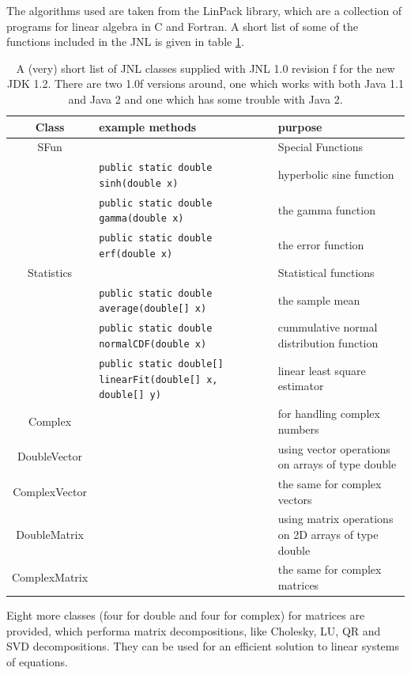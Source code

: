 The algorithms used are taken from the LinPack library, which
are a collection of programs for linear algebra in C and Fortran.
A short list of some of the functions included in the JNL is
given in table \ref{tab:JNL}.
\begin{table}
    \begin{tabular}{>{\large}c||>{\scriptsize}l|l}
      \textbf{Class}  & \normalsize\textbf{example methods} & \textbf{purpose} \\\hline\hline
      SFun &  & Special Functions \\
           & \verb|public static double sinh(double x)| & hyperbolic sine function \\
           & \verb|public static double gamma(double x)| & the gamma function \\
           & \verb|public static double erf(double x)| & the error function \\\hline
      Statistics &  & Statistical functions \\
           & \verb|public static double average(double[] x)| & the sample mean\\
           & \verb|public static double normalCDF(double x)| & 
                             cummulative normal distribution function\\
           & \verb|public static double[] linearFit(double[] x, double[] y)| &
                             linear least square estimator \\\hline
      Complex &  & for handling complex numbers \\\hline
      DoubleVector &  & using vector operations on arrays of type double\\
      ComplexVector & & the same for complex vectors \\\hline 
      DoubleMatrix &  & using matrix operations on 2D arrays of type double\\
      ComplexMatrix & & the same for complex matrices \\\hline 
    \end{tabular}
    \caption{A (very) short list of JNL classes supplied with JNL 1.0 revision f for the new JDK 1.2. There are two 1.0f versions around, one which works with both Java 1.1 and Java 2 and one which has some trouble with Java 2.}
    \label{tab:JNL}
\end{table}
Eight more classes (four for double and four for complex) for
matrices are provided, which performa matrix decompositions,
like Cholesky, LU, QR and SVD decompositions. They can be
used for an efficient solution to linear systems of equations.
 

